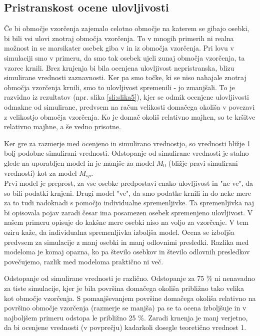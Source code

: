 \subsection{Pristranskost ocene ulovljivosti}
Če bi območje vzorčenja zajemalo celotno območje na katerem se gibajo osebki, bi bili vsi ulovi znotraj območja vzorčenja. To v mnogih primerih ni realna možnost in se marsikater osebek giba v in iz območja vzorčenja. Pri lovu v simulaciji smo v primeru, da smo tak osebek ujeli zunaj območja vzorčenja, ta vzorec krnili. Brez krnjenja bi bila ocenjena ulovljivost nepristranska, blizu simulirane vrednosti zaznavnosti. Ker pa smo točke, ki se niso nahajale znotraj območja vzorčenja krnili, smo to ulovljivost spremenili - jo zmanjšali. To je razvidno iz rezultatov (npr. slika \ref{sli:slika5}), kjer se odmik ocenjene ulovljivosti odmakne od simulirane, predvsem na račun velikosti domačega okoliša v povezavi z velikostjo območja vzorčenja. Ko je domač okoliš relativno majhen, so te kršitve relativno majhne, a še vedno prisotne.

Ker gre za razmerje med ocenjeno in simulirano vrednostjo, so vrednosti bližje 1 bolj podobne simulirani vrednosti. Odstopanje od simulirane vrednosti je stalno glede na uporabljen model in je manjše za model $M_0$ (bližje pravi simulirani vrednosti) kot za model $M_{sp}$.\\
Prvi model je preprost, za vse osebke predpostavi enako ulovljivost in "ne ve", da so bili podatki krnjeni. Drugi model "ve", da smo podatke krnili in do neke mere za to tudi nadoknadi s pomočjo individualne spremenljivke. Ta spremenljivka naj bi opisovala pojav zaradi česar ima posamezen osebek spremenjeno ulovljivost. V našem primeru opisuje do kakšne mere osebki niso na voljo za vzorčenje. V tem oziru kaže, da individualna spremenljivka izboljša model. Ocena se izboljša predvsem za simulacije z manj osebki in manj odlovnimi presledki. Razlika med modeloma je komaj opazna, ko pa število osebkov in število odlovnih presledkov povečujemo, razlik med modeloma praktično ni več.

Odstopanje od simulirane vrednosti je različno. Odstopanje za 75 \% ni nenavadno za tiste simulacije, kjer je bila površina domačega okoliša približno tako velika kot območje vzorčenja. S pomanjševanjem površine domačega okoliša relativno na površino območje vzorčenja (razmerje se manjša) pa se ta ocena izboljšuje in v najboljšem primeru odstopa le približno 25 \%. Zaradi krnenja je manj verjetno, da bi ocenjene vrednosti (v povprečju) kadarkoli dosegle teoretično vrednost 1.

